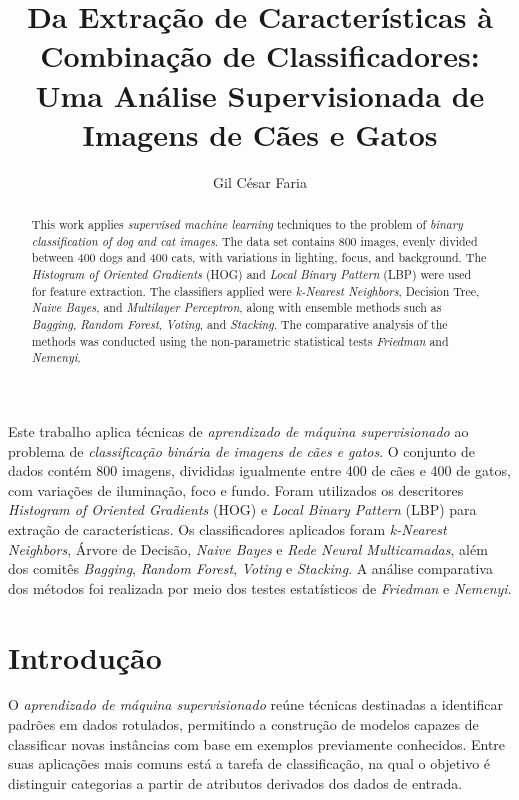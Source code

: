 \documentclass[12pt]{article}
\title{Da Extração de Características à Combinação de Classificadores: Uma Análise Supervisionada de Imagens de Cães e Gatos}
\author{Gil César Faria\inst{1}}
\begin{document}
 
\pagestyle{plain}

\maketitle

\begin{abstract}
This work applies \textit{supervised machine learning} techniques to the problem of \textit{binary classification of dog and cat images}. The data set contains 800 images, evenly divided between 400 dogs and 400 cats, with variations in lighting, focus, and background. The \textit{Histogram of Oriented Gradients} (HOG) and \textit{Local Binary Pattern} (LBP) were used for feature extraction. The classifiers applied were \textit{k-Nearest Neighbors}, Decision Tree, \textit{Naive Bayes}, and \textit{Multilayer Perceptron}, along with ensemble methods such as \textit{Bagging}, \textit{Random Forest}, \textit{Voting}, and \textit{Stacking}. The comparative analysis of the methods was conducted using the non-parametric statistical tests \textit{Friedman} and \textit{Nemenyi}.
\end{abstract}
     
\begin{resumo} 
Este trabalho aplica técnicas de \textit{aprendizado de máquina supervisionado} ao problema de \textit{classificação binária de imagens de cães e gatos}. O conjunto de dados contém 800 imagens, divididas igualmente entre 400 de cães e 400 de gatos, com variações de iluminação, foco e fundo. Foram utilizados os descritores \textit{Histogram of Oriented Gradients} (HOG) e \textit{Local Binary Pattern} (LBP) para extração de características. Os classificadores aplicados foram \textit{k-Nearest Neighbors}, Árvore de Decisão, \textit{Naive Bayes} e \textit{Rede Neural Multicamadas}, além dos comitês \textit{Bagging}, \textit{Random Forest}, \textit{Voting} e \textit{Stacking}. A análise comparativa dos métodos foi realizada por meio dos testes estatísticos de \textit{Friedman} e \textit{Nemenyi}.
\end{resumo}
\newpage
\section{Introdução}

O \textit{aprendizado de máquina supervisionado} reúne técnicas destinadas a identificar padrões em dados rotulados, permitindo a construção de modelos capazes de classificar novas instâncias com base em exemplos previamente conhecidos. Entre suas aplicações mais comuns está a tarefa de classificação, na qual o objetivo é distinguir categorias a partir de atributos derivados dos dados de entrada.
\end{document}
